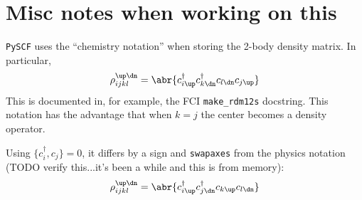 \documentclass[10pt]{article}
\begin{document}
\section{Misc notes when working on this}

\verb|PySCF| uses the ``chemistry notation'' when storing the 2-body density matrix. In particular,
\begin{align}
  \label{eq:chem}
  \rho^{\up \dn}_{ijkl}
  =
  \abr{c_{i\up}^\dag c_{k\dn}^\dag c_{l\dn} c_{j\up}}
\end{align}
This is documented in, for example, the FCI \verb|make_rdm12s| docstring. 
This notation has the advantage that when $k = j$ the center becomes a density operator.

Using $\{c_i^\dag,c_j\} = 0$, it differs by a sign and \verb|swapaxes| from the physics notation (TODO verify this...it's been a while and this is from memory):
\begin{align}
  \rho^{\up \dn}_{ijkl}
  =
  \abr{c_{i\up}^\dag c_{j\dn}^\dag c_{k\up} c_{l\dn}}
\end{align}
\end{document}
